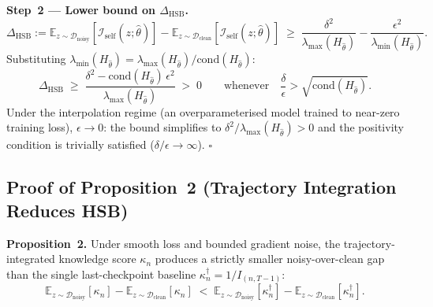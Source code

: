 \textbf{Step~2 --- Lower bound on $\Delta_\text{HSB}$.}
\begin{equation}
    \Delta_\text{HSB}
    := \mathbb{E}_{z \sim \mathcal{D}_\text{noisy}}[\mathcal{I}_\text{self}(z;\hat\theta)]
     - \mathbb{E}_{z \sim \mathcal{D}_\text{clean}}[\mathcal{I}_\text{self}(z;\hat\theta)]
    \;\geq\; \frac{\delta^2}{\lambda_{\max}(H_{\hat\theta})} - \frac{\epsilon^2}{\lambda_{\min}(H_{\hat\theta})}.
\end{equation}
Substituting $\lambda_{\min}(H_{\hat\theta}) = \lambda_{\max}(H_{\hat\theta})/\mathrm{cond}(H_{\hat\theta})$:
\begin{equation}
    \Delta_\text{HSB}
    \;\geq\; \frac{\delta^2 - \mathrm{cond}(H_{\hat\theta})\,\epsilon^2}{\lambda_{\max}(H_{\hat\theta})}
    \;>\; 0
    \qquad \text{whenever} \quad \frac{\delta}{\epsilon} > \sqrt{\mathrm{cond}(H_{\hat\theta})}.
\end{equation}
Under the interpolation regime (an overparameterised model trained to near-zero training loss), $\epsilon \to 0$: the bound simplifies to $\delta^2/\lambda_{\max}(H_{\hat\theta}) > 0$ and the positivity condition is trivially satisfied ($\delta/\epsilon \to \infty$). $\square$

\subsection{Proof of Proposition~2 (Trajectory Integration Reduces HSB)}
\label{app:proof-traj}

\textbf{Proposition~2.}
Under smooth loss and bounded gradient noise, the trajectory-integrated knowledge score $\kappa_n$ produces a strictly smaller noisy-over-clean gap than the single last-checkpoint baseline $\kappa^\dagger_n = 1/I_{(n,T-1)}$:
\begin{equation}
    \mathbb{E}_{z \sim \mathcal{D}_\text{noisy}}[\kappa_n]
    - \mathbb{E}_{z \sim \mathcal{D}_\text{clean}}[\kappa_n]
    \;<\;
    \mathbb{E}_{z \sim \mathcal{D}_\text{noisy}}[\kappa^\dagger_n]
    - \mathbb{E}_{z \sim \mathcal{D}_\text{clean}}[\kappa^\dagger_n].
\end{equation}

